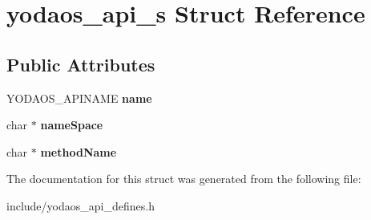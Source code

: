 \hypertarget{structyodaos__api__s}{}\section{yodaos\+\_\+api\+\_\+s Struct Reference}
\label{structyodaos__api__s}
\subsection*{Public Attributes}
\begin{DoxyCompactItemize}
\item 
\mbox{\label{structyodaos__api__s_aefedfbbb1d71476975602b4e695d8e86}} 
Y\+O\+D\+A\+O\+S\+\_\+\+A\+P\+I\+N\+A\+ME {\bfseries name}
\item 
\mbox{\label{structyodaos__api__s_a00b9f14d501f3a93f814765b727d6300}} 
char $\ast$ {\bfseries name\+Space}
\item 
\mbox{\label{structyodaos__api__s_ad1f360d74608b38ddf8ca6d3dd4f8e93}} 
char $\ast$ {\bfseries method\+Name}
\end{DoxyCompactItemize}


The documentation for this struct was generated from the following file\+:\begin{DoxyCompactItemize}
\item 
include/yodaos\+\_\+api\+\_\+defines.\+h\end{DoxyCompactItemize}
